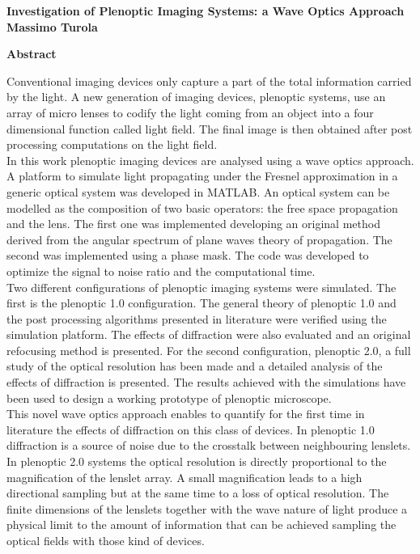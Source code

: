 \thispagestyle{plain}
\begin{center}
	\Large
	\textbf{Investigation of Plenoptic Imaging Systems: a Wave Optics Approach}
	\vspace{0.4cm}
	\\
	\large
	\textbf{Massimo Turola}
	
	\vspace{0.9cm}
	\textbf{Abstract}
\end{center}

Conventional imaging devices only capture a part of the total information carried by the light. A new generation of imaging devices, plenoptic systems, use an array of micro lenses to codify the light coming from an object into a four dimensional function called light field. The final image is then obtained after post processing computations on the light field. \\
 In this work plenoptic imaging devices are analysed using a wave optics approach. A platform to simulate light propagating under the Fresnel approximation in a generic optical system was developed in MATLAB. An optical system can be modelled as the composition of two basic operators: the free space propagation and the lens. The first one was implemented developing an original method derived from the angular spectrum of plane waves theory of propagation. The second was implemented using a phase mask. The code was developed to optimize the signal to noise ratio and the computational time.
 \\
Two different configurations of plenoptic imaging systems were simulated. The first is the plenoptic 1.0 configuration. The general theory of plenoptic 1.0 and the post processing algorithms presented in literature were verified using the simulation platform. The effects of diffraction were also evaluated and an original refocusing method is presented. For the second configuration, plenoptic 2.0, a full study of the optical resolution has been made and a detailed analysis of the effects of diffraction is presented. The results achieved with the simulations have been used to design a working prototype of plenoptic microscope.
\\
 This novel wave optics approach enables to quantify for the first time in literature the effects of diffraction on this class of devices. In plenoptic 1.0 diffraction is a source of noise due to the crosstalk between neighbouring lenslets. In plenoptic 2.0 systems the optical resolution is directly proportional to the magnification of the lenslet array. A small magnification leads to a high directional sampling but at the same time to a loss of optical resolution. The finite dimensions of the lenslets together with the wave nature of light produce a physical limit to the amount of information that can be achieved sampling the optical fields with those kind of devices.